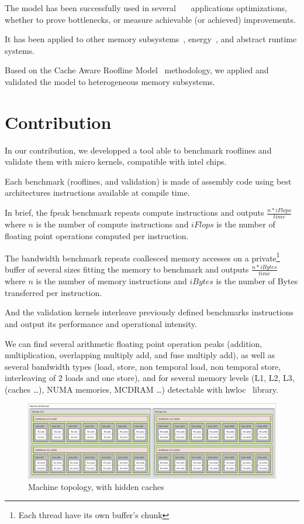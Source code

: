 \documentclass[runningheads,a4paper]{llncs}
\begin{document}
The model has been successfully used in
several~\cite{Kim20111201}~\cite{Rossinelli2164}~\cite{vanNieuwpoort:2009:UMH:1542275.1542337} applications optimizations, whether
to prove bottlenecks, or measure achievable (or achieved) improvements.

It has been applied to other memory subsystems~\cite{ilic2014cache}, energy~\cite{7493653}, and abstract runtime systems.

Based on the Cache Aware Roofline Model~\cite{ilic2014cache} methodology, we applied and validated the model to heterogeneous
memory subsystems.

\section{Contribution}
\label{sec:contrib}

In our contribution, we developped a tool able to benchmark rooflines and validate them with micro kernels, compatible with intel
chips.

Each benchmark (rooflines, and validation) is made of assembly code using best architectures instructions available at compile
time.

In brief, the fpeak benchmark repeats compute instructions and outputs $\frac{n*iFlops}{time}$ where $n$ is the number of compute
instructions and $iFlops$ is the number of floating point operations computed per instruction.

The bandwidth benchmark repeats coallesced memory accesses on a private\footnote{Each thread have its own buffer's chunk} buffer of several sizes fitting the memory to benchmark and outputs $\frac{n*iBytes}{time}$ where $n$ is the number of memory instructions and $iBytes$ is the number of Bytes transferred per instruction.

And the validation kernels interleave previously defined benchmarks instructions and output its performance and operational intensity.

We can find several arithmetic floating point operation peaks (addition, multiplication, overlapping multiply add, and fuse
multiply add), as well as several bandwidth types (load, store, non temporal load, non temporal store, interleaving of 2 loads and one store), and for several memory levels (L1, L2, L3, (caches \dots), NUMA memories, MCDRAM \dots) detectable with hwloc~\cite{6903671} library.

\begin{figure}
  \centering
  \includegraphics[width=\textwidth]{pictures/Xeon_E5_2650L_v4}
  \caption{Machine topology, with hidden caches}
  \label{fig:joe0}
\end{figure}
\end{document}
